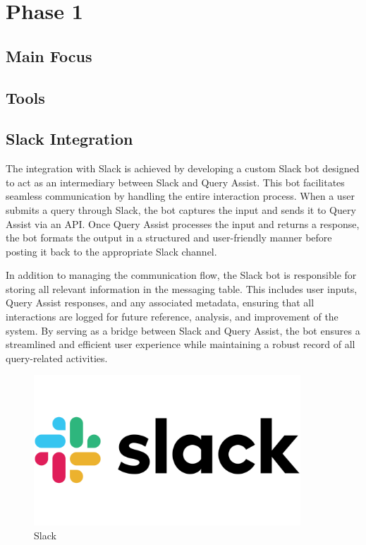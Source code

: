 \section{Phase 1}
    \subsection{Main Focus}
    \subsection{Tools}
    \subsection{Slack Integration}
    The integration with Slack is achieved by developing a custom Slack bot designed to act as an intermediary between Slack and Query Assist. This bot facilitates seamless communication by handling the entire interaction process. When a user submits a query through Slack, the bot captures the input and sends it to Query Assist via an API. Once Query Assist processes the input and returns a response, the bot formats the output in a structured and user-friendly manner before posting it back to the appropriate Slack channel.

    In addition to managing the communication flow, the Slack bot is responsible for storing all relevant information in the messaging table. This includes user inputs, Query Assist responses, and any associated metadata, ensuring that all interactions are logged for future reference, analysis, and improvement of the system. By serving as a bridge between Slack and Query Assist, the bot ensures a streamlined and efficient user experience while maintaining a robust record of all query-related activities.
    \begin{figure}[H]
        \centering
        \includegraphics[width=10cm]{chapters/3/figures/Slack-Logo.png}
        \caption[Slack]{Slack}
        \label{fig:slack-logo}
    \end{figure}
